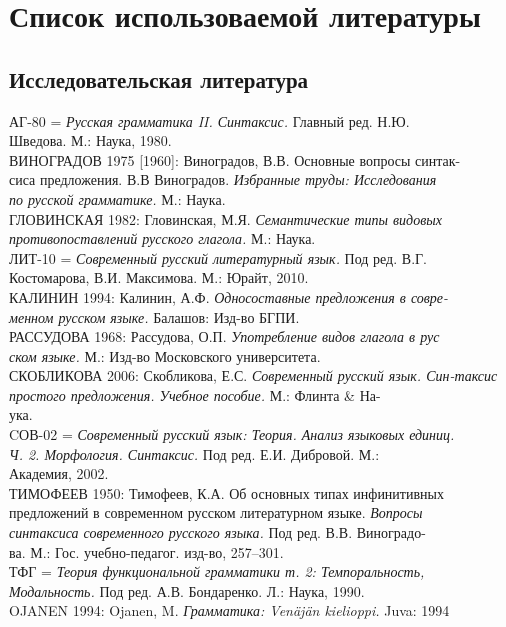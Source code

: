 \newcommand{\indenttext}{\hspace*{4ex}}
\newcommand{\cutline}{\\\indenttext}
\newcommand{\cutword}{-\cutline}

\section*{Список использоваемой литературы}
\setlength{\parindent}{0cm}
\begin{normalsize}
\subsection*{Исследовательская литература}
АГ-80 = \textit{Русская грамматика II. Синтаксис.} Главный ред. Н.Ю.\cutline Шведова. М.: Наука, 1980.\\
ВИНОГРАДОВ 1975 [1960]: Виноградов, В.В. Основные вопросы синтак\cutword сиса предложения. В.В Виноградов. \textit{Избранные труды: Исследования\cutline по русской грамматике.} М.: Наука.\\
ГЛОВИНСКАЯ 1982: Гловинская, М.Я. \textit{Семантические типы видовых\cutline противопоставлений русского глагола.} М.: Наука.\\
ЛИТ-10 = \textit{Современный русский литературный язык.} Под ред. В.Г.\cutline Костомарова, В.И. Максимова. М.: Юрайт, 2010.\\
КАЛИНИН 1994: Калинин, А.Ф. \textit{Односоставные предложения в совре\cutword менном русском языке.} Балашов: Изд-во БГПИ. \\
РАССУДОВА 1968: Рассудова, О.П. \textit{Употребление видов глагола в рус\cutline ском языке.} М.: Изд-во Московского университета.\\
СКОБЛИКОВА 2006: Скобликова, Е.С. \textit{Современный русский язык. Син-\indenttext таксис простого предложения. Учебное пособие.} М.: Флинта \& На\cutword ука.\\
CОВ-02 = \textit{Современный русский язык: Теория. Анализ языковых единиц.\cutline Ч. 2. Морфология. Синтаксис.} Под ред. Е.И. Дибровой. М.:\cutline Академия, 2002.\\
ТИМОФЕЕВ 1950: Тимофеев, К.А. Об основных типах инфинитивных \indenttext предложений в современном русском литературном языке. \textit{Вопросы \cutline синтаксиса современного русского языка.} Под ред. В.В. Виноградо\cutword ва. М.: Гос. учебно-педагог. изд-во, 257--301.\\
ТФГ = \textit{Теория функциональной грамматики т. 2: Темпоральность, \cutline Модальность.} Под ред. А.В. Бондаренко. Л.: Наука, 1990.\\
OJANEN 1994: Ojanen, M. \textit{Грамматика: Venäjän kielioppi.} Juva: 1994 
\end{normalsize}